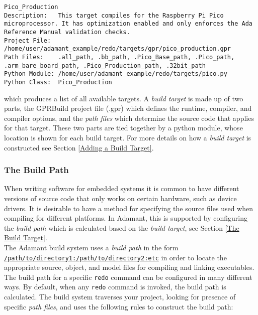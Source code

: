 \begin{verbatim}
Pico_Production
Description:   This target compiles for the Raspberry Pi Pico microprocessor. It has optimization enabled and only enforces the Ada Reference Manual validation checks.
Project File:  /home/user/adamant_example/redo/targets/gpr/pico_production.gpr
Path Files:    .all_path, .bb_path, .Pico_Base_path, .Pico_path, .arm_bare_board_path, .Pico_Production_path, .32bit_path
Python Module: /home/user/adamant_example/redo/targets/pico.py
Python Class:  Pico_Production
\end{verbatim}
\vspace{5mm} %

which produces a list of all available targets. A \textit{build target} is made up of two parts, the GPRBuild project file (.gpr) which defines the runtime, compiler, and compiler options, and the \textit{path files} which determine the source code that applies for that target. These two parts are tied together by a python module, whose location is shown for each build target. For more details on how a \textit{build target} is constructed see Section \ref{Adding a Build Target}. \\

\subsubsection{The Build Path} \label{The Build Path}

When writing software for embedded systems it is common to have different versions of source code that only works on certain hardware, such as device drivers. It is desirable to have a method for specifying the source files used when compiling for different platforms. In Adamant, this is supported by configuring the \textit{build path} which is calculated based on the \textit{build target}, see Section \ref{The Build Target}. \\

The Adamant build system uses a \textit{build path} in the form \texttt{\url{/path/to/directory1:/path/to/directory2:etc}} in order to locate the appropriate source, object, and model files for compiling and linking executables. The build path for a specific \texttt{redo} command can be configured in many different ways. By default, when any \texttt{redo} command is invoked, the build path is calculated. The build system traverses your project, looking for presence of specific \textit{path files}, and uses the following rules to construct the build path:

